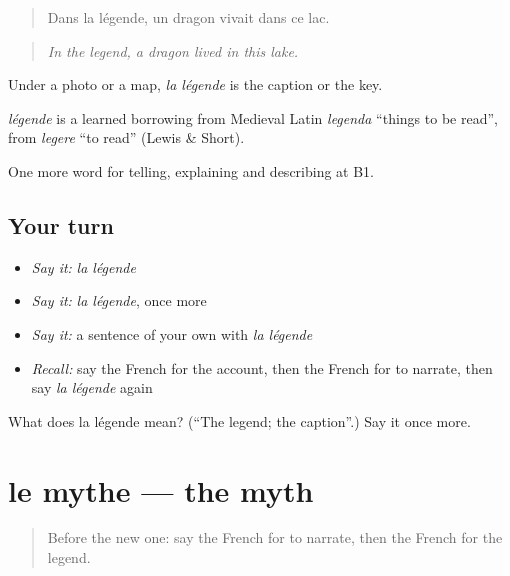 \begin{quote}
Dans la légende, un dragon vivait dans ce lac.
\end{quote}

\begin{quote}
\emph{In the legend, a dragon lived in this lake.}
\end{quote}

Under a photo or a map, \emph{la légende} is the caption or the key.

\begin{cousinweb}
\emph{légende} is a learned borrowing from Medieval Latin \emph{legenda} \textquotedblleft{}things to be read\textquotedblright{}, from \emph{legere} \textquotedblleft{}to read\textquotedblright{} (Lewis \& Short).
\end{cousinweb}

\begin{grammarlens}[title={What you've built}]
One more word for telling, explaining and describing at B1.
\end{grammarlens}

\subsection*{Your turn}
\begin{itemize}
\raggedright
  \item \emph{Say it:} \emph{la légende}
  \item \emph{Say it:} \emph{la légende}, once more
  \item \emph{Say it:} a sentence of your own with \emph{la légende}
  \item \emph{Recall:} say the French for the account, then the French for to narrate, then say \emph{la légende} again
\end{itemize}

\begin{tcolorbox}[breakable,colback=teal!4,colframe=teal!35!black,title={Before you move on}]
What does la légende mean? (\textquotedblleft{}The legend; the caption\textquotedblright{}.) Say it once more.
\end{tcolorbox}
\section[le mythe]{le mythe — the myth}

\label{lesson:FR-C322-mythe}



\begin{quote}
Before the new one: say the French for to narrate, then the French for the legend.
\end{quote}

